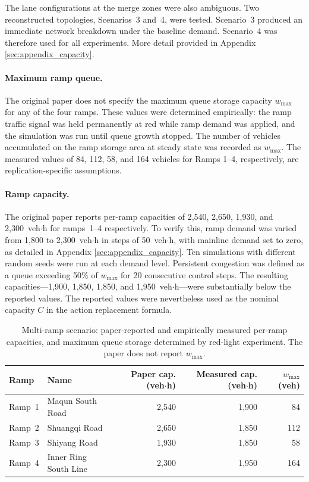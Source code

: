 The lane configurations at the merge zones were also ambiguous. Two reconstructed topologies, Scenarios~3 and~4, were tested. Scenario~3 produced an immediate network breakdown under the baseline demand. Scenario~4 was therefore used for all experiments. More detail provided in Appendix \ref{sec:appendix_capacity}.

\paragraph{Maximum ramp queue.}
The original paper does not specify the maximum queue storage capacity $w_{\max}$ for any of the four ramps. These values were determined empirically: the ramp traffic signal was held permanently at red while ramp demand was applied, and the simulation was run until queue growth stopped. The number of vehicles accumulated on the ramp storage area at steady state was recorded as $w_{\max}$. The measured values of 84, 112, 58, and 164 vehicles for Ramps 1--4, respectively, are replication-specific assumptions.

\paragraph{Ramp capacity.}
The original paper reports per-ramp capacities of 2{,}540, 2{,}650, 1{,}930, and 2{,}300~veh$\cdot$h for ramps~1--4 respectively. To verify this, ramp demand was varied from 1{,}800 to 2{,}300~veh$\cdot$h in steps of 50~veh$\cdot$h, with mainline demand set to zero, as detailed in Appendix \ref{sec:appendix_capacity}. Ten simulations with different random seeds were run at each demand level. Persistent congestion was defined as a queue exceeding 50\% of $w_{\max}$ for 20 consecutive control steps. The resulting capacities---1{,}900, 1{,}850, 1{,}850, and 1{,}950~veh$\cdot$h---were substantially below the reported values. The reported values were nevertheless used as the nominal capacity $C$ in the action replacement formula.

\begin{table}[!h]
    \centering
    \caption{Multi-ramp scenario: paper-reported and empirically measured per-ramp capacities, and maximum queue storage determined by red-light experiment. The paper does not report $w_{\max}$.}
    \label{tab:ramp_params}
    \begin{tabular}{llrrr}
    \toprule
    \textbf{Ramp} & \textbf{Name} & \thead{\textbf{Paper cap.}\\\textbf{(veh$\cdot$h)}} & \thead{\textbf{Measured cap.}\\\textbf{(veh$\cdot$h)}} & \thead{\textbf{$w_{\max}$}\\\textbf{(veh)}} \\
    \midrule
    Ramp~1 & Maqun South Road      & 2{,}540 & 1{,}900 & 84 \\
    Ramp~2 & Shuangqi Road         & 2{,}650 & 1{,}850 & 112 \\
    Ramp~3 & Shiyang Road          & 1{,}930 & 1{,}850 & 58 \\
    Ramp~4 & Inner Ring South Line & 2{,}300 & 1{,}950 & 164 \\
    \bottomrule
    \end{tabular}
\end{table}

